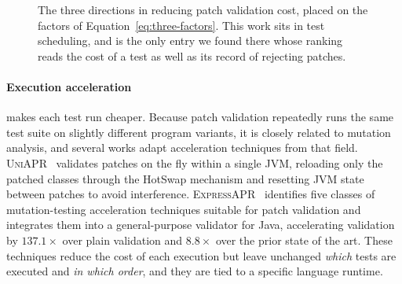 \begin{figure}[htbp]
{}
\caption[The three directions in validation-cost reduction]{The three
directions in reducing patch validation cost, placed on the factors of
Equation~\eqref{eq:three-factors}. This work sits in test scheduling, and is
the only entry we found there whose ranking reads the cost of a test as well
as its record of rejecting patches.}
\label{fig:three-axes}
\end{figure}


\paragraph{Execution acceleration} makes each test run cheaper. Because patch
validation repeatedly runs the same test suite on slightly different program
variants, it is closely related to mutation analysis, and several works adapt
acceleration techniques from that field. \textsc{UniAPR}~\citep{chen2021uniapr}
validates patches on the fly within a single JVM, reloading only the patched
classes through the HotSwap mechanism and resetting JVM state between patches to
avoid interference. \textsc{ExpressAPR}~\citep{xiao2024expressapr} identifies
five classes of mutation-testing acceleration techniques suitable for patch
validation and integrates them into a general-purpose validator for Java,
accelerating validation by $137.1\times$ over plain validation and $8.8\times$
over the prior state of the art. These techniques reduce the cost of each
execution but leave unchanged \emph{which} tests are executed and \emph{in which
order}, and they are tied to a specific language runtime.

